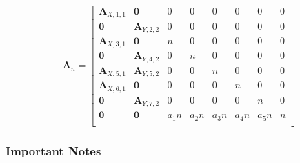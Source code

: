 \documentclass[]{article}
\begin{document}
\[
\pmb{A}_n = \begin{bmatrix}
    \pmb{A}_{X,1,1}   &    \pmb{0}     &    0     &     0 & 0 & 0 & 0 & 0\\
            \pmb{0}   &     \pmb{A}_{Y,2,2}     &    0     &     0 & 0 & 0 & 0 & 0\\
          \pmb{A}_{X, 3,1}   &     \pmb{0}     &    n     &     0 & 0 & 0 & 0 & 0\\
            \pmb{0}   & \pmb{A}_{Y, 4,2} &    0     &     n & 0 & 0 & 0 & 0\\
            \pmb{A}_{X,5,1}   &     \pmb{A}_{Y,5,2}     & 0 &    0 & n & 0 & 0 & 0\\
          \pmb{A}_{X, 6,1}   &     \pmb{0}     &    0     &     0 & 0 & n & 0 & 0\\
            \pmb{0}   & \pmb{A}_{Y, 7,2} &    0     &     0 & 0 & 0 & n & 0\\
            \pmb{0}   & \pmb{0} &    a_1n & a_2n &  a_3n & a_4n & a_5n & n\\
\end{bmatrix}
\]

\subsubsection{Important Notes}
\end{document}
